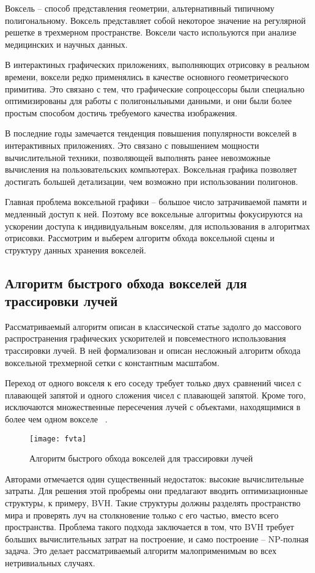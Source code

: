 Воксель -- способ представления геометрии, альтернативный типичному
полигональному. Воксель представляет собой некоторое значение на регулярной решетке в 
трехмерном пространстве. Воксели часто испольуются при анализе медицинских и научных
данных.

В интерактиных графических приложениях, выполняющих отрисовку в реальном времени, воксели 
редко применялись в качестве основного геометрического примитива. Это связано с тем, что
графические сопроцессоры были специально оптимизированы для работы с полигоныльными данными,
и они были более простым способом достичь требуемого качества изображения. 

В последние годы замечается тенденция повышения популярности вокселей в интерактивных приложениях.
Это связано с повышением мощности вычислительной техники, позволяющей выполнять ранее невозможные
вычисления на пользовательских компьютерах. Воксельная графика позволяет достигать большей детализации,
чем возможно при использовании полигонов. 

Главная проблема воксельной графики -- большое число затрачиваемой памяти и медленный доступ к ней.
Поэтому все воксельные алгоритмы фокусируются на ускорении доступа к индивидуальным вокселям, для
использования в алгоритмах отрисовки. Рассмотрим и выберем алгоритм обхода воксельной сцены и 
структуру данных хранения вокселей.

\subsection{Алгоритм быстрого обхода вокселей для трассировки лучей}
Рассматриваемый алгоритм описан в классической статье задолго до массового распространения 
графических ускорителей и повсеместного использования трассировки лучей. В ней формализован и описан несложный алгоритм обхода 
воксельной трехмерной сетки с константным масштабом.

Переход от одного вокселя к его соседу требует только двух сравнений чисел с плавающей запятой и 
одного сложения чисел с плавающей запятой. Кроме того, исключаются множественные пересечения лучей 
с объектами, находящимися в более чем одном вокселе
~\cite{AFVTAfRT}.

\begin{figure}[htbp]
  \centering
  \texttt{[image: fvta]}
  \caption{Алгоритм быстрого обхода вокселей для трассировки лучей}
\end{figure}

Авторами отмечается один существенный недостаток: высокие вычислительные затраты. Для решения
этой пробремы они предлагают вводить оптимизационные структуры, к примеру, BVH. Такие структуры должны разделять пространство мира
и проверять луч на столкновение только с его частью, вместо всего пространства. Проблема такого 
подхода заключается в том, что BVH требует больших вычислительных затрат на построение, и
само построение -- NP-полная задача. Это делает рассматриваемый алгоритм малоприменимым во 
всех нетривиальных случаях.

